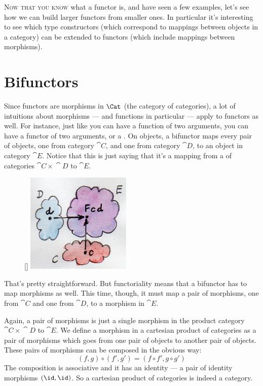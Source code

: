 \lettrine[lhang=0.17]{N}{ow that you know} what a functor is, and have seen a few examples, let's
see how we can build larger functors from smaller ones. In particular
it's interesting to see which type constructors (which correspond to
mappings between objects in a category) can be extended to functors
(which include mappings between morphisms).

\section{Bifunctors}

Since functors are morphisms in $\Cat$ (the category of categories),
a lot of intuitions about morphisms --- and functions in particular ---
apply to functors as well. For instance, just like you can have a
function of two arguments, you can have a functor of two arguments, or a
. On objects, a bifunctor maps every pair of objects,
one from category $\cat{C}$, and one from category $\cat{D}$, to an object in category
$\cat{E}$. Notice that this is just saying that it's a mapping from a
 of categories $\cat{C}\times{}\cat{D}$ to $\cat{E}$. 
\begin{figure}
\raisebox{0pt}[\dimexpr{}\baselineskip\relax]{
\includegraphics[width=50mm]{images/bifunctor.jpg}}
\end{figure}

\noindent
That's pretty straightforward. But functoriality means that a bifunctor
has to map morphisms as well. This time, though, it must map a pair of
morphisms, one from $\cat{C}$ and one from $\cat{D}$, to a morphism in $\cat{E}$.

Again, a pair of morphisms is just a single morphism in the product
category $\cat{C}\times{}\cat{D}$ to $\cat{E}$. We define a morphism in a cartesian product of categories
as a pair of morphisms which goes from one pair of objects to another
pair of objects. These pairs of morphisms can be composed in the obvious
way:
\[(f, g) \circ (f', g') = (f \circ f', g \circ g')\]
The composition is associative and it has an identity --- a pair of
identity morphisms $(\id, \id)$. So a cartesian product of categories
is indeed a category.

